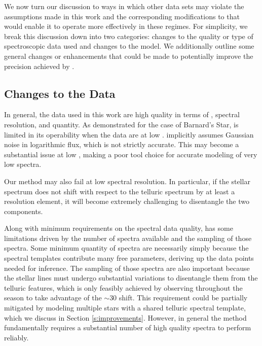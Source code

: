 \documentclass[modern]{aastex62}
\newcommand{\Mdwarf}{Barnard's Star\xspace} %
\begin{document}
We now turn our discussion to ways in which other data sets may violate the assumptions made in this work and the corresponding modifications to \wobble that would enable it to operate more effectively in these regimes.
For simplicity, we break this discussion down into two categories: changes to the quality or type of spectroscopic data used and changes to the model.
We additionally outline some general changes or enhancements that could be made to potentially improve the \RV precision achieved by \wobble.

\subsection{Changes to the Data}
\label{s:data-changes}

In general, the data used in this work are high quality in terms of \SNR, spectral resolution, and quantity.
As demonstrated for the case of \Mdwarf, \wobble is limited in its operability when the data are at low \SNR.
\wobble implicitly assumes Gaussian noise in logarithmic flux, which is not strictly accurate.
This may become a substantial issue at low \SNR, making \wobble a poor tool choice for accurate modeling of very low \SNR spectra.

Our method may also fail at low spectral resolution.
In particular, if the stellar spectrum does not shift with respect to the telluric spectrum by at least a resolution element, it will become extremely challenging to disentangle the two components.

Along with minimum requirements on the spectral data quality, \wobble has some limitations driven by the number of spectra available and the sampling of those spectra.
Some minimum quantity of spectra are necessarily simply because the spectral templates contribute many free parameters, deriving up the data points needed for inference.
The sampling of those spectra are also important because the stellar lines must undergo substantial \RV variations to disentangle them from the telluric features, which is only feasibly achieved by observing throughout the season to take advantage of the $\sim 30$ \kms \BERV shift.
This requirement could be partially mitigated by modeling multiple stars with a shared telluric spectral template, which we discuss in Section \ref{s:improvements}.
However, in general the \wobble method fundamentally requires a substantial number of high quality spectra to perform reliably.
\end{document}
